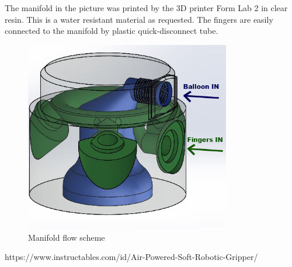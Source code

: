 \documentclass{article}
\begin{document}
The manifold in the picture was printed by the 3D printer Form Lab 2 in clear resin. This is a water resistant material as requested.
The fingers are easily connected to the manifold by plastic quick-disconnect tube.

\begin{figure}[h]
    \centering
    \includegraphics[width=0.8\textwidth]{Pictures/fingerOnToroidal/ManifoldSchemeFlowPhotoshop.jpg}
    \caption{Manifold flow scheme} 
    \label{fig:flowSchemeManifold}
\end{figure}




\begin{thebibliography}
 https://www.instructables.com/id/Air-Powered-Soft-Robotic-Gripper/
\end{thebibliography}
\end{document}
